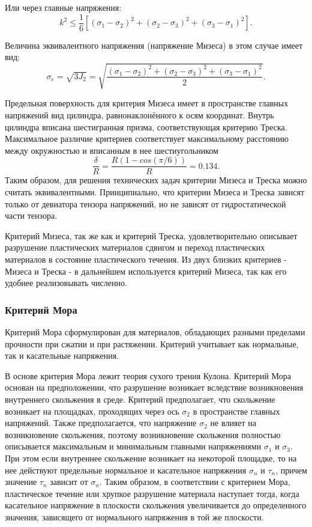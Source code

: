Или через главные напряжения:
\begin{equation}
\label{von_mises_criteria_principal_stresses}
k^2 \le \frac{1}{6}[(\sigma_1 - \sigma_2)^2 + (\sigma_2 - \sigma_3)^2 + (\sigma_3 - \sigma_1)^2 ].
\end{equation}

Величина эквивалентного напряжения (напряжение Мизеса) в этом случае имеет вид:
\begin{equation}
\label{von_mises_equivalent_stress}
\sigma_e = \sqrt{ 3 J_2 } = \sqrt{ \frac{ (\sigma_1 - \sigma_2)^2 + (\sigma_2 - \sigma_3)^2 + (\sigma_3 - \sigma_1)^2 }{2} }.
\end{equation}

Предельная поверхность для критерия Мизеса имеет в пространстве главных напряжений вид цилиндра, равнонаклонённого к осям координат. Внутрь цилиндра вписана шестигранная призма, соответствующая критерию Треска. Максимальное различие критериев соответствует максимальному расстоянию между окружностью и вписанным в нее шестиугольником
\begin{equation}
\frac{\delta}{R} = \frac{R(1-cos(\pi/6))}{R} = 0.134.
\end{equation}
Таким образом, для решения технических задач критерии Мизеса и Треска можно считать эквивалентными. Принципиально, что критерии Мизеса и Треска зависят только от девиатора тензора напряжений, но не зависят от гидростатической части тензора.

Критерий Мизеса, так же как и критерий Треска, удовлетворительно описывает разрушение пластических материалов сдвигом и переход пластических материалов в состояние пластического течения. Из двух близких критериев - Мизеса и Треска - в дальнейшем используется критерий Мизеса, так как его удобнее реализовывать численно.


\subsubsection{Критерий Мора}

Критерий Мора сформулирован для материалов, обладающих разными пределами прочности при сжатии и при растяжении. Критерий учитывает как нормальные, так и касательные напряжения.

В основе критерия Мора лежит теория сухого трения Кулона. Критерий Мора основан на предположении, что разрушение возникает вследствие возникновения внутреннего скольжения в среде. Критерий предполагает, что скольжение возникает на площадках, проходящих через ось $\sigma_2$ в пространстве главных напряжений. Также предполагается, что напряжение $\sigma_2$ не влияет на возникновение скольжения, поэтому возникновение скольжения полностью описывается максимальным и минимальным главными напряжениями $\sigma_1$ и $\sigma_3$. При этом если внутреннее скольжение возникает на некоторой площадке, то на нее действуют предельные нормальное и касательное напряжения $\sigma_n$ и $\tau_n$, причем значение $\tau_n$ зависит от $\sigma_n$. Таким образом, в соответствии с критерием Мора, пластическое течение или хрупкое разрушение материала наступает тогда, когда касательное напряжение в плоскости скольжения увеличивается до определенного значения, зависящего от нормального напряжения в той же плоскости.

